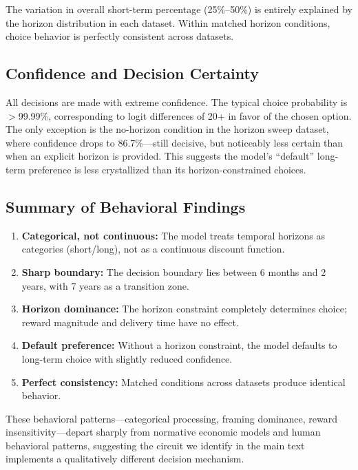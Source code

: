 \documentclass{article}
\begin{document}
The variation in overall short-term percentage (25\%--50\%) is entirely explained by the horizon distribution in each dataset. Within matched horizon conditions, choice behavior is perfectly consistent across datasets.

\subsection{Confidence and Decision Certainty}

All decisions are made with extreme confidence. The typical choice probability is $>$99.99\%, corresponding to logit differences of 20+ in favor of the chosen option. The only exception is the no-horizon condition in the horizon sweep dataset, where confidence drops to 86.7\%---still decisive, but noticeably less certain than when an explicit horizon is provided. This suggests the model's ``default'' long-term preference is less crystallized than its horizon-constrained choices.

\subsection{Summary of Behavioral Findings}

\begin{enumerate}
    \item \textbf{Categorical, not continuous:} The model treats temporal horizons as categories (short/long), not as a continuous discount function.
    \item \textbf{Sharp boundary:} The decision boundary lies between 6 months and 2 years, with 7 years as a transition zone.
    \item \textbf{Horizon dominance:} The horizon constraint completely determines choice; reward magnitude and delivery time have no effect.
    \item \textbf{Default preference:} Without a horizon constraint, the model defaults to long-term choice with slightly reduced confidence.
    \item \textbf{Perfect consistency:} Matched conditions across datasets produce identical behavior.
\end{enumerate}

These behavioral patterns---categorical processing, framing dominance, reward insensitivity---depart sharply from normative economic models and human behavioral patterns, suggesting the circuit we identify in the main text implements a qualitatively different decision mechanism.


\newpage

\end{document}
